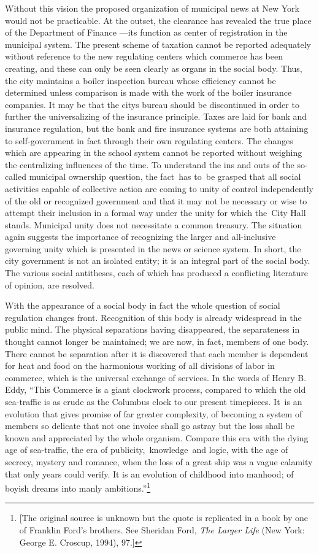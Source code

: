 \documentclass[twoside,symmetric,nobib,justified]{tufte-book}
\begin{document}
Without this vision the proposed organization of municipal news at New
York would not be practicable. At the outset, the clearance has revealed
the true place of the Department of Finance ---its function as center of
registration in the municipal system. The present scheme of taxation
cannot be reported adequately without reference to the new regulating
centers which commerce has been creating, and these can only be seen
clearly as organs in the social body. Thus, the city maintains a boiler
inspection bureau whose efficiency cannot be determined unless
comparison is made with the work of the boiler insurance companies. It
may be that the city\textquotesingle s bureau should be discontinued in
order to further the universalizing of the insurance principle. Taxes
are laid for bank and insurance regulation, but the bank and fire
insurance systems are both attaining to self-government in fact through
their own regulating centers. The changes which are appearing in the
school system cannot be reported without weighing the centralizing
influences of the time. To understand the ins and outs of the so-called
municipal ownership question, the fact~has to~be grasped that all social
activities capable of collective action are coming to unity of control
independently of the old or recognized government and that it may not be
necessary or wise to attempt their inclusion in a formal way under the
unity for which the~City Hall stands. Municipal unity does not
necessitate a common treasury. The situation again suggests the
importance of recognizing the larger and all-inclusive governing unity
which is presented in the news or science system. In short, the city
government is not an isolated entity; it is an integral part of the
social body. The various social antitheses, each of which has produced a
conflicting literature of opinion, are resolved.~

With the appearance of a social body in fact the whole question of
social regulation changes front. Recognition of this body is already
widespread in the public mind. The physical separations having
disappeared, the separateness in thought cannot longer be maintained; we
are now, in fact, members of one body. There cannot be separation after
it is discovered that each member is dependent for heat and food on the
harmonious working of all divisions of labor in commerce, which is the
universal exchange of services. In the words of Henry B. Eddy, ``This
Commerce is a giant clockwork process, compared to which the old
sea-traffic is as crude as the Columbus clock to our present timepieces.
It~is an evolution that gives promise of far greater complexity, of
becoming a system of members so delicate that not one invoice shall go
astray but the loss shall be known and appreciated by the whole
organism. Compare this era with the dying age of sea-traffic, the era of
publicity,~knowledge~and logic, with the age of secrecy, mystery and
romance, when the loss of a great ship was a vague calamity that only
years could verify. It is an evolution of childhood into manhood; of
boyish dreams into manly ambitions.''\footnote{{[}The original source is
  unknown but the quote is replicated in a book by one of Franklin
  Ford's brothers. See Sheridan Ford, \emph{The Larger Life} (New York:
  George E. Croscup, 1994), 97.{]}}~
\end{document}
